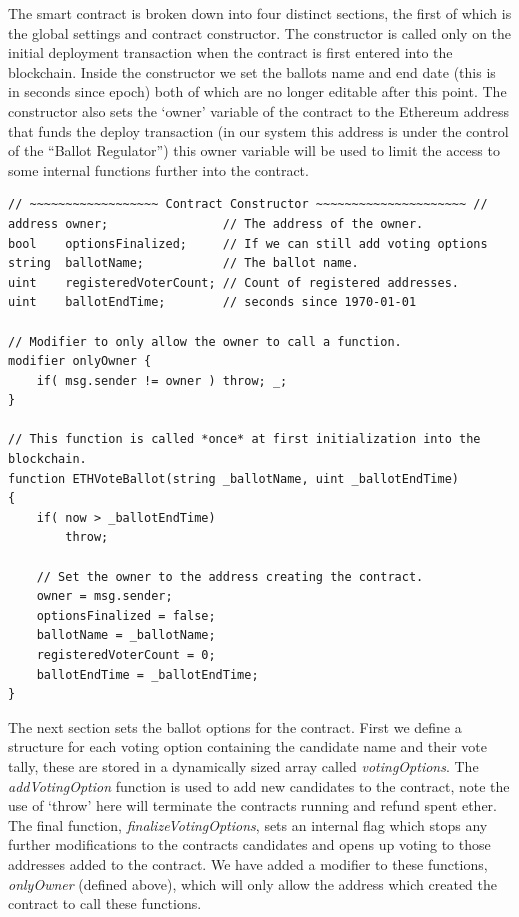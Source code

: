 \documentclass{article}
\begin{document}
The smart contract is broken down into four distinct sections, the first of which is the global settings and contract constructor. The constructor is called only on the initial deployment transaction when the contract is first entered into the blockchain. Inside the constructor we set the ballots name and end date (this is in seconds since epoch) both of which are no longer editable after this point. The constructor also sets the `owner' variable of the contract to the Ethereum address that funds the deploy transaction (in our system this address is under the control of the ``Ballot Regulator'') this owner variable will be used to limit the access to some internal functions further into the contract.

\begin{lstlisting}[caption=Contract constructor called when deploying the contract.]
// ~~~~~~~~~~~~~~~~~~ Contract Constructor ~~~~~~~~~~~~~~~~~~~~~ //
address owner;                // The address of the owner. 
bool    optionsFinalized;     // If we can still add voting options
string  ballotName;           // The ballot name.
uint    registeredVoterCount; // Count of registered addresses.
uint    ballotEndTime;        // seconds since 1970-01-01

// Modifier to only allow the owner to call a function.
modifier onlyOwner {
    if( msg.sender != owner ) throw; _;
}

// This function is called *once* at first initialization into the blockchain.
function ETHVoteBallot(string _ballotName, uint _ballotEndTime)
{
    if( now > _ballotEndTime)
        throw;

    // Set the owner to the address creating the contract.
    owner = msg.sender;
    optionsFinalized = false; 
    ballotName = _ballotName;
    registeredVoterCount = 0;
    ballotEndTime = _ballotEndTime;
}
\end{lstlisting}

\clearpage
The next section sets the ballot options for the contract. First we define a structure for each voting option containing the candidate name and their vote tally, these are stored in a dynamically sized array called \textit{votingOptions}. The \textit{addVotingOption} function is used to add new candidates to the contract, note the use of `throw' here will terminate the contracts running and refund spent ether. The final function, \textit{finalizeVotingOptions}, sets an internal flag which stops any further modifications to the contracts candidates and opens up voting to those addresses added to the contract. We have added a modifier to these functions, \textit{onlyOwner} (defined above), which will only allow the address which created the contract to call these functions.
\end{document}
